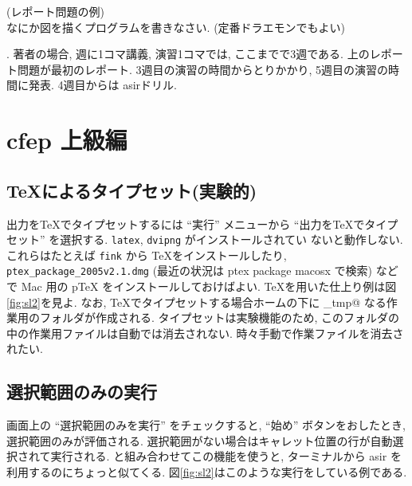 \documentclass{jbook}
\begin{document}
\begin{problem} \rm
(レポート問題の例) \\
なにか図を描くプログラムを書きなさい. (定番ドラエモンでもよい)
\end{problem}

\noindent
{}.
著者の場合, 週に1コマ講義, 演習1コマでは, ここまでで3週である.
上のレポート問題が最初のレポート.
3週目の演習の時間からとりかかり, 5週目の演習の時間に発表.
4週目からは asirドリル.

\chapter{cfep 上級編}

\section{\TeX によるタイプセット(実験的)}
出力をTeXでタイプセットするには 
``実行'' メニューから ``出力をTeXでタイプセット'' を選択する.
{\tt latex}, {\tt dvipng} がインストールされてい
ないと動作しない.
これらはたとえば {\tt fink}  から \TeX をインストールしたり,
{\tt ptex\_package\_2005v2.1.dmg} (最近の状況は ptex package macosx で検索)
などで Mac 用の pTeX をインストールしておけばよい.
\TeX を用いた仕上り例は図\ref{fig:sl2}を見よ. 
なお, \TeX でタイプセットする場合ホームの下に
\verb@OpenXM_tmp@ なる作業用のフォルダが作成される.
タイプセットは実験機能のため, このフォルダの中の作業用ファイルは自動では消去されない.
時々手動で作業ファイルを消去されたい.

\section{選択範囲のみの実行}

画面上の ``選択範囲のみを実行'' をチェックすると,
``始め'' ボタンをおしたとき, 選択範囲のみが評価される.
選択範囲がない場合はキャレット位置の行が自動選択されて実行される.
 と組み合わせてこの機能を使うと, ターミナルから 
asir を利用するのにちょっと似てくる.
図\ref{fig:sl2}はこのような実行をしている例である.
\end{document}
